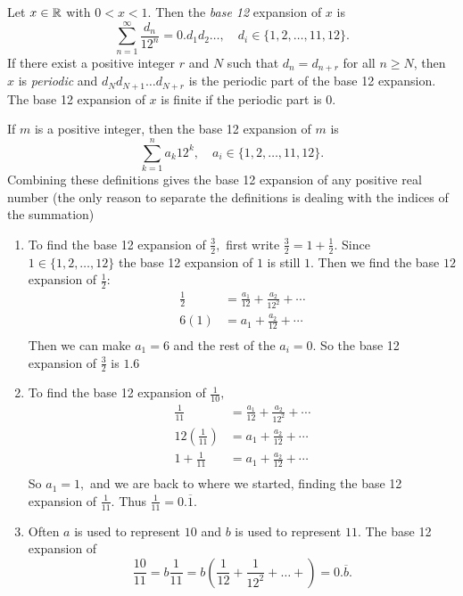 \documentclass[letterpaper, 11 pt,handout,hints]{ximera}
\begin{document}
\begin{exploration}
 
\begin{definition}
	Let $x\in\mathbb R$ with $0<x<1.$ Then the \emph{base 12} expansion of $x$ is \[\sum_{n=1}^\infty \frac{d_n}{12^n}=0.d_1 d_2\dots, \quad d_i\in\{1,2,\dots,11,12\}.\]
	If there exist a positive integer $r$ and $N$ such that $d_n=d_{n+r}$ for all $n\geq N$, then $x$ is \emph{periodic} and $d_Nd_{N+1}\dots d_{N+r}$ is the periodic part of the base 12 expansion.
	The base 12 expansion of $x$ is finite if the periodic part is $0.$
	
	If $m$ is a positive integer, then the base 12 expansion of $m$ is  
	\[\sum_{k=1}^n {a_k}{12^k}, \quad a_i\in\{1,2,\dots,11,12\}.\]
	Combining these definitions gives the base 12 expansion of any positive real number (the only reason to separate the definitions is dealing with the indices of the summation)
\end{definition}

\begin{example}\label{ex:duodec}
	\begin{enumerate}
 		\item To find the base 12 expansion of $\frac{3}{2},$ first write $\frac{3}{2}=1+\frac{1}{2}.$ Since $1\in\{1,2,\dots,12\}$ the base 12 expansion of $1$ is still $1.$ Then we find the base $12$ expansion of $\frac{1}{2}:$
			\begin{align*}
 				\frac{1}{2}&=\frac{a_1}{12}+\frac{a_2}{12^2}+\cdots\\
				6(1)&={a_1}+\frac{a_2}{12}+\cdots\\
			\end{align*}
		Then we can make $a_1=6$ and the rest of the $a_i=0.$ So the base 12 expansion of $\frac{3}{2}$ is $1.6$

		\item To find the base 12 expansion of $\frac{1}{10},$ 
			\begin{align*}
				\frac{1}{11}&=\frac{a_1}{12}+\frac{a_2}{12^2}+\cdots\\
				12\left(\frac{1}{11}\right)&={a_1}+\frac{a_2}{12}+\cdots\\
				1+\frac{1}{11}&={a_1}+\frac{a_2}{12}+\cdots\\
			\end{align*}
			So $a_1=1,$ and we are back to where we started, finding the base 12 expansion of $\frac{1}{11}.$ Thus $\frac{1}{11}=0.\overline{1}.$
		\item Often $a$ is used to represent $10$ and $b$ is used to represent $11.$ The base 12 expansion of \[\frac{10}{11}=b\frac{1}{11}=b\left(\frac{1}{12}+\frac{1}{12^2}+\dots+\right)=0.\overline{b}.\]
	\end{enumerate}
	

\end{example}
\end{exploration}
\end{document}
